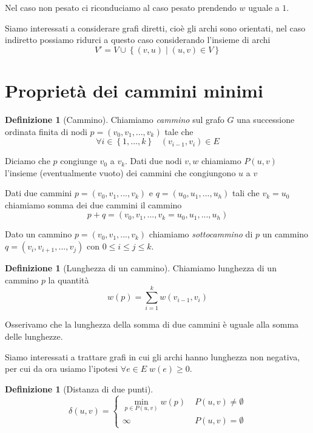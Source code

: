 \documentclass[a4paper,10pt]{amsbook}
\newcounter{counter1}
\theoremstyle{plain}
\theoremstyle{definition}
\newtheorem{mydef}[counter1]{Definizione}
\theoremstyle{remark}
\newcommand{\set}[1]{\left\{#1\right\}}
\newcommand{\pa}[1]{\left(#1\right)}
\begin{document}
Nel caso non pesato ci riconduciamo al caso pesato prendendo $w$
uguale a $1$.

Siamo interessati a considerare grafi diretti, cioè gli archi sono
orientati, nel caso indiretto possiamo ridurci a questo caso
considerando l'insieme di archi 
\[ V' = V \cup \set{ (v,u) \mid (u,v) \in V } \]

\section{Proprietà dei cammini minimi}

\begin{mydef}[Cammino]
  Chiamiamo \textit{cammino} sul grafo $G$ una successione ordinata
  finita di nodi $p = ( v_0, v_1, ..., v_k)$ tale che 
  \[ \forall i \in \set{ 1, ... , k} \;\;\; (v_{i-1}, v_{i} ) \in E\]
\end{mydef}

Diciamo che $p$ congiunge $v_0$ a $v_k$. Dati due nodi $v,w$ chiamiamo
$P(u,v)$ l'insieme (eventualmente vuoto) dei cammini che congiungono
$u$ a $v$

Dati due cammini $p = ( v_0, v_1, ..., v_k)$ e $q = ( u_0, u_1, ...,
u_{h})$ tali che $v_k = u_0$ chiamiamo somma dei due cammini il
cammino
\[ p+q = ( v_0, v_1, ..., v_k= u_0, u_1, ..., u_{h}) \]

Dato un cammino $p = ( v_0, v_1, ..., v_k)$ chiamiamo
\textit{sottocammino} di $p$ un cammino $q = ( v_i , v_{i+1}, ... ,
v_j )$ con $0 \le i \le j \le k$.

\begin{mydef}[Lunghezza di un cammino]
  Chiamiamo lunghezza di un cammino $p$ la quantità
  \[ w(p) = \sum _{i=1} ^k w \pa{ v_{i-1}, v_i } \]
\end{mydef}

Osserivamo che la lunghezza della somma di due cammini è uguale alla
somma delle lunghezze.

Siamo interessati a trattare grafi in cui gli archi hanno lunghezza
non negativa, per cui da ora usiamo l'ipotesi $\forall e \in E \; w(e)
\ge 0$.

\begin{mydef}[Distanza di due punti]
  \[ \delta(u,v) = \left\{
    \begin{matrix}
      \min \limits_{p \in P(u,v)} { w(p) } & \; P(u,v) \neq \emptyset \\
      \infty & \; P(u,v) = \emptyset
    \end{matrix}
    \right.
    \]
\end{mydef}
\end{document}
